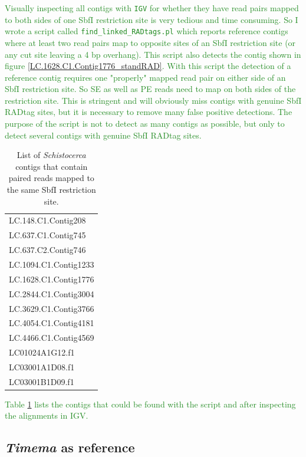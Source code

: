 \documentclass{article}\usepackage[]{graphicx}\usepackage[]{color}
\newcommand{\roger}[1]{ \textcolor[named]{ForestGreen}{#1} }
\begin{document}
\roger{Visually inspecting all contigs with \texttt{IGV} for whether they have read pairs mapped to both sides of one SbfI restriction site is very tedious and time consuming. So I wrote a script called \texttt{find\_linked\_RADtags.pl} which reports reference contigs where at least two read pairs map to opposite sites of an SbfI restriction site (or any cut site leaving a 4 bp overhang). This script also detects the contig shown in figure \ref{LC.1628.C1.Contig1776_standRAD}. With this script the detection of a reference contig requires one "properly" mapped read pair on either side of an SbfI restriction site. So SE as well as PE reads need to map on both sides of the restriction site. This is stringent and will obviously miss contigs with genuine SbfI RADtag sites, but it is necessary to remove many false positive detections. The purpose of the script is not to detect as many contigs as possible, but only to detect several contigs with genuine SbfI RADtag sites.}

\begin{table}
\centering
\caption{List of \textit{Schistocerca} contigs that contain paired reads mapped to the same SbfI restriction site.}
\begin{tabular}{l}
\toprule
LC.148.C1.Contig208 \\
LC.637.C1.Contig745 \\
LC.637.C2.Contig746 \\
LC.1094.C1.Contig1233 \\
LC.1628.C1.Contig1776 \\
LC.2844.C1.Contig3004 \\
LC.3629.C1.Contig3766 \\
LC.4054.C1.Contig4181 \\
LC.4466.C1.Contig4569 \\
LC01024A1G12.f1 \\
LC03001A1D08.f1 \\
LC03001B1D09.f1 \\
\bottomrule
\end{tabular}
\label{linked_RADtag_contigs}
\end{table}

\roger{Table \ref{linked_RADtag_contigs} lists the contigs that could be found with the script and after inspecting the alignments in IGV.}

\subsection{\textit{Timema} as reference}
\end{document}
